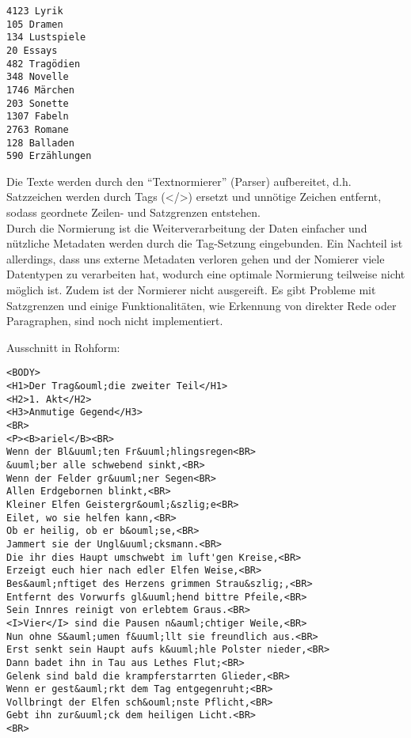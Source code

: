 \documentclass[]{article}
\begin{document}
\vspace{4 mm}\begin{verbatim}
4123 Lyrik
105 Dramen
134 Lustspiele
20 Essays
482 Tragödien
348 Novelle
1746 Märchen
203 Sonette
1307 Fabeln
2763 Romane
128 Balladen
590 Erzählungen
\end{verbatim}\vspace{4 mm}

Die Texte werden durch den ``Textnormierer'' (Parser) aufbereitet, d.h.
Satzzeichen werden durch Tags (\textless{}/\textgreater{}) ersetzt und
unnötige Zeichen entfernt, sodass geordnete Zeilen- und Satzgrenzen
entstehen.\\
Durch die Normierung ist die Weiterverarbeitung der Daten einfacher und
nützliche Metadaten werden durch die Tag-Setzung eingebunden. Ein
Nachteil ist allerdings, dass uns externe Metadaten verloren gehen und
der Nomierer viele Datentypen zu verarbeiten hat, wodurch eine optimale
Normierung teilweise nicht möglich ist. Zudem ist der Normierer nicht
ausgereift. Es gibt Probleme mit Satzgrenzen und einige
Funktionalitäten, wie Erkennung von direkter Rede oder Paragraphen, sind
noch nicht implementiert.

Ausschnitt in Rohform:

\vspace{4 mm}\begin{verbatim}
<BODY>
<H1>Der Trag&ouml;die zweiter Teil</H1>
<H2>1. Akt</H2>
<H3>Anmutige Gegend</H3>
<BR>
<P><B>ariel</B><BR>
Wenn der Bl&uuml;ten Fr&uuml;hlingsregen<BR>
&uuml;ber alle schwebend sinkt,<BR>
Wenn der Felder gr&uuml;ner Segen<BR>
Allen Erdgebornen blinkt,<BR>
Kleiner Elfen Geistergr&ouml;&szlig;e<BR>
Eilet, wo sie helfen kann,<BR>
Ob er heilig, ob er b&ouml;se,<BR>
Jammert sie der Ungl&uuml;cksmann.<BR>
Die ihr dies Haupt umschwebt im luft'gen Kreise,<BR>
Erzeigt euch hier nach edler Elfen Weise,<BR>
Bes&auml;nftiget des Herzens grimmen Strau&szlig;,<BR>
Entfernt des Vorwurfs gl&uuml;hend bittre Pfeile,<BR>
Sein Innres reinigt von erlebtem Graus.<BR>
<I>Vier</I> sind die Pausen n&auml;chtiger Weile,<BR>
Nun ohne S&auml;umen f&uuml;llt sie freundlich aus.<BR>
Erst senkt sein Haupt aufs k&uuml;hle Polster nieder,<BR>
Dann badet ihn in Tau aus Lethes Flut;<BR>
Gelenk sind bald die krampferstarrten Glieder,<BR>
Wenn er gest&auml;rkt dem Tag entgegenruht;<BR>
Vollbringt der Elfen sch&ouml;nste Pflicht,<BR>
Gebt ihn zur&uuml;ck dem heiligen Licht.<BR>
<BR>
\end{verbatim}\vspace{4 mm}
\end{document}
